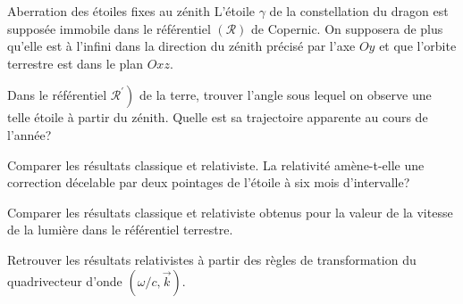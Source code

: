 \begin{exo}[PC][1][colle]{Aberration des étoiles fixes au zénith}
L'étoile $\gamma$ de la constellation du dragon est supposée immobile dans le référentiel $(\mathcal{R})$ de Copernic. On supposera de plus qu'elle est à l'infini dans la direction du zénith précisé par l'axe $O y$ et que l'orbite terrestre est dans le plan $O x z$.
\begin{quest}
  \item Dans le référentiel $\left.\mathcal{R}^{\prime}\right)$ de la terre, trouver l'angle sous lequel on observe une telle étoile à partir du zénith. Quelle est sa trajectoire apparente au cours de l'année?
  \item Comparer les résultats classique et relativiste. La relativité amène-t-elle une correction décelable par deux pointages de l'étoile à six mois d'intervalle?
  \item Comparer les résultats classique et relativiste obtenus pour la valeur de la vitesse de la lumière dans le référentiel terrestre.
  \item Retrouver les résultats relativistes à partir des règles de transformation du quadrivecteur d'onde $(\omega / c, \vec{k})$.
\end{quest}
  
\end{exo}



